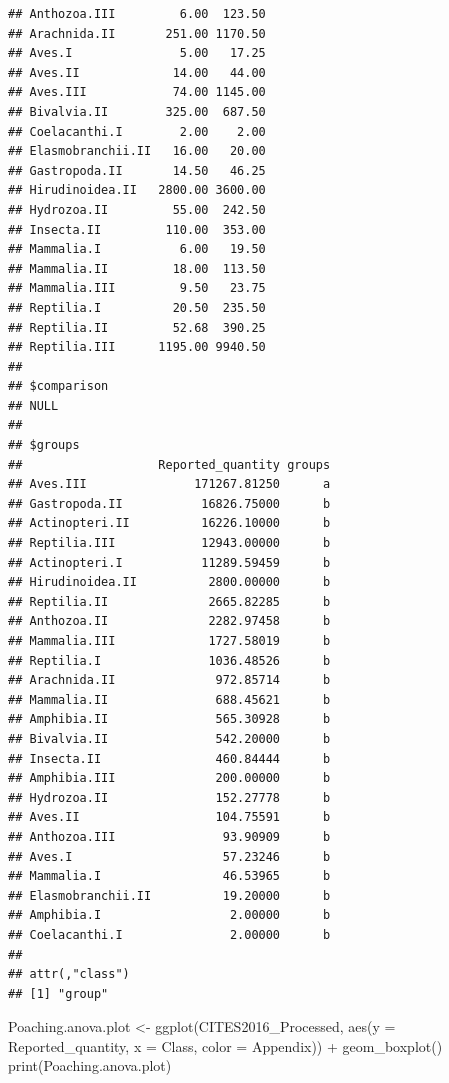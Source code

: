\documentclass[
  12pt,
]{article}
\newenvironment{Shaded}{\begin{snugshade}}{\end{snugshade}}
\newcommand{\AttributeTok}[1]{\textcolor[rgb]{0.77,0.63,0.00}{#1}}
\newcommand{\FunctionTok}[1]{\textcolor[rgb]{0.00,0.00,0.00}{#1}}
\newcommand{\NormalTok}[1]{#1}
\newcommand{\OtherTok}[1]{\textcolor[rgb]{0.56,0.35,0.01}{#1}}
\newcommand{\SpecialCharTok}[1]{\textcolor[rgb]{0.00,0.00,0.00}{#1}}
\begin{document}
\begin{verbatim}
## Anthozoa.III         6.00  123.50
## Arachnida.II       251.00 1170.50
## Aves.I               5.00   17.25
## Aves.II             14.00   44.00
## Aves.III            74.00 1145.00
## Bivalvia.II        325.00  687.50
## Coelacanthi.I        2.00    2.00
## Elasmobranchii.II   16.00   20.00
## Gastropoda.II       14.50   46.25
## Hirudinoidea.II   2800.00 3600.00
## Hydrozoa.II         55.00  242.50
## Insecta.II         110.00  353.00
## Mammalia.I           6.00   19.50
## Mammalia.II         18.00  113.50
## Mammalia.III         9.50   23.75
## Reptilia.I          20.50  235.50
## Reptilia.II         52.68  390.25
## Reptilia.III      1195.00 9940.50
## 
## $comparison
## NULL
## 
## $groups
##                   Reported_quantity groups
## Aves.III               171267.81250      a
## Gastropoda.II           16826.75000      b
## Actinopteri.II          16226.10000      b
## Reptilia.III            12943.00000      b
## Actinopteri.I           11289.59459      b
## Hirudinoidea.II          2800.00000      b
## Reptilia.II              2665.82285      b
## Anthozoa.II              2282.97458      b
## Mammalia.III             1727.58019      b
## Reptilia.I               1036.48526      b
## Arachnida.II              972.85714      b
## Mammalia.II               688.45621      b
## Amphibia.II               565.30928      b
## Bivalvia.II               542.20000      b
## Insecta.II                460.84444      b
## Amphibia.III              200.00000      b
## Hydrozoa.II               152.27778      b
## Aves.II                   104.75591      b
## Anthozoa.III               93.90909      b
## Aves.I                     57.23246      b
## Mammalia.I                 46.53965      b
## Elasmobranchii.II          19.20000      b
## Amphibia.I                  2.00000      b
## Coelacanthi.I               2.00000      b
## 
## attr(,"class")
## [1] "group"
\end{verbatim}

\begin{Shaded}
\begin{Highlighting}[]
\NormalTok{Poaching.anova.plot }\OtherTok{\textless{}{-}} \FunctionTok{ggplot}\NormalTok{(CITES2016\_Processed, }\FunctionTok{aes}\NormalTok{(}\AttributeTok{y =}\NormalTok{ Reported\_quantity, }\AttributeTok{x =}\NormalTok{ Class,}
    \AttributeTok{color =}\NormalTok{ Appendix)) }\SpecialCharTok{+} \FunctionTok{geom\_boxplot}\NormalTok{()}
\FunctionTok{print}\NormalTok{(Poaching.anova.plot)}
\end{Highlighting}
\end{Shaded}
\end{document}
